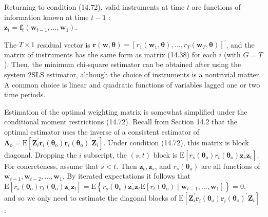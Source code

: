 \documentclass[10pt]{article}
\begin{document}
Returning to condition (14.72), valid instruments at time $t$ are functions of information known at time $t-1$ :\\
$\mathbf{z}_{t}=\mathbf{f}_{t}\left(\mathbf{w}_{t-1}, \ldots, \mathbf{w}_{1}\right)$.

The $T \times 1$ residual vector is $\mathbf{r}(\mathbf{w}, \boldsymbol{\theta})=\left[r_{1}\left(\mathbf{w}_{1}, \boldsymbol{\theta}\right), \ldots, r_{T}\left(\mathbf{w}_{T}, \boldsymbol{\theta}\right)\right]^{\prime}$, and the matrix of instruments has the same form as matrix (14.38) for each $i$ (with $G=T$ ). Then, the minimum chi-square estimator can be obtained after using the system 2SLS estimator, although the choice of instruments is a nontrivial matter. A common choice is linear and quadratic functions of variables lagged one or two time periods.

Estimation of the optimal weighting matrix is somewhat simplified under the conditional moment restrictions (14.72). Recall from Section 14.2 that the optimal estimator uses the inverse of a consistent estimator of $\boldsymbol{\Lambda}_{\mathrm{o}}=\mathrm{E}\left[\mathbf{Z}_{i}^{\prime} \mathbf{r}_{i}\left(\boldsymbol{\theta}_{\mathrm{o}}\right) \mathbf{r}_{i}\left(\boldsymbol{\theta}_{\mathrm{o}}\right)^{\prime} \mathbf{Z}_{i}\right]$. Under condition (14.72), this matrix is block diagonal. Dropping the $i$ subscript, the $(s, t)$ block is $\mathrm{E}\left[r_{s}\left(\boldsymbol{\theta}_{\mathrm{o}}\right) r_{t}\left(\boldsymbol{\theta}_{\mathrm{o}}\right) \mathbf{z}_{s}^{\prime} \mathbf{z}_{t}\right]$. For concreteness, assume that $s<t$. Then $\mathbf{z}_{t}, \mathbf{z}_{s}$, and $r_{s}\left(\boldsymbol{\theta}_{\mathrm{o}}\right)$ are all functions of $\mathbf{w}_{t-1}, \mathbf{w}_{t-2}, \ldots, \mathbf{w}_{1}$. By iterated expectations it follows that\\
$\mathrm{E}\left[r_{s}\left(\boldsymbol{\theta}_{\mathrm{o}}\right) r_{t}\left(\boldsymbol{\theta}_{\mathrm{o}}\right) \mathbf{z}_{s}^{\prime} \mathbf{z}_{t}\right]=\mathrm{E}\left\{r_{s}\left(\boldsymbol{\theta}_{\mathrm{o}}\right) \mathbf{z}_{s}^{\prime} \mathbf{z}_{t} \mathrm{E}\left[r_{t}\left(\boldsymbol{\theta}_{\mathrm{o}}\right) \mid \mathbf{w}_{t-1}, \ldots, \mathbf{w}_{1}\right]\right\}=0$,\\
and so we only need to estimate the diagonal blocks of $\mathrm{E}\left[\mathbf{Z}_{i}^{\prime} \mathbf{r}_{i}\left(\boldsymbol{\theta}_{\mathrm{o}}\right) \mathbf{r}_{i}\left(\boldsymbol{\theta}_{\mathrm{o}}\right)^{\prime} \mathbf{Z}_{i}\right]$ :
\end{document}
